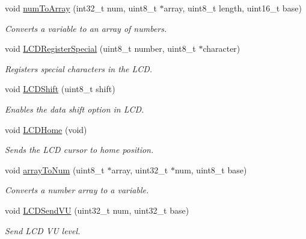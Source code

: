 \begin{DoxyCompactItemize}
void \hyperlink{group__lcd__h_ga6fb89345366fbf76f2ab64e128a1eaae}{num\-To\-Array} (int32\-\_\-t num, uint8\-\_\-t $\ast$array, uint8\-\_\-t length, uint16\-\_\-t base)
\begin{DoxyCompactList}\small\item\em Converts a variable to an array of numbers. \end{DoxyCompactList}\item 
void \hyperlink{group__lcd__h_gae4c4a47ab102aad380f49e65ffb62c39}{L\-C\-D\-Register\-Special} (uint8\-\_\-t number, uint8\-\_\-t $\ast$character)
\begin{DoxyCompactList}\small\item\em Registers special characters in the L\-C\-D. \end{DoxyCompactList}\item 
void \hyperlink{group__lcd__h_ga7844790b6bfe761b4eb51f3dda0705ac}{L\-C\-D\-Shift} (uint8\-\_\-t shift)
\begin{DoxyCompactList}\small\item\em Enables the data shift option in L\-C\-D. \end{DoxyCompactList}\item 
void \hyperlink{group__lcd__h_gaaafcc9bb116e4ac997a76fb626b64f67}{L\-C\-D\-Home} (void)
\begin{DoxyCompactList}\small\item\em Sends the L\-C\-D cursor to home position. \end{DoxyCompactList}\item 
void \hyperlink{group__lcd__h_ga9fd5ca15fc3f4409eef61069558a4b8e}{array\-To\-Num} (uint8\-\_\-t $\ast$array, uint32\-\_\-t $\ast$num, uint8\-\_\-t base)
\begin{DoxyCompactList}\small\item\em Converts a number array to a variable. \end{DoxyCompactList}\item 
void \hyperlink{group__lcd__h_gac002f3125c0e84fcba52a2ee41855b61}{L\-C\-D\-Send\-V\-U} (uint32\-\_\-t num, uint32\-\_\-t base)
\begin{DoxyCompactList}\small\item\em Send L\-C\-D V\-U level. \end{DoxyCompactList}\end{DoxyCompactItemize}
